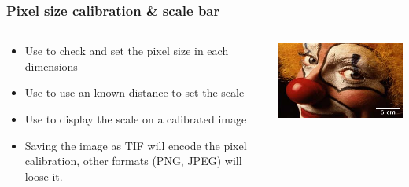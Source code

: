 \documentclass[ignorenonframetext,aspectratio=169,10pt,xcolor=table]{beamer}
\begin{document}
\begin{frame} \frametitle{Pixel size calibration \& scale bar}
  \begin{columns}
    \begin{column}{0.5\textwidth}
      \begin{itemize} \setlength\itemsep{1em}
      \item Use  to check and set the
        pixel size in each dimensions
      \item Use  to use an known distance
        to set the scale
      \item Use  to display the scale on
        a calibrated image
      \item Saving the image as TIF will encode the pixel calibration, other
      formats (PNG, JPEG) will loose it.
      \end{itemize}
    \end{column}
    \begin{column}{0.5\textwidth}
      \includegraphics[width=\textwidth]{clown-scale}
    \end{column}
  \end{columns}
\end{frame}
\end{document}
